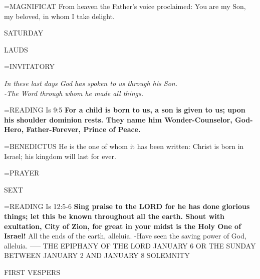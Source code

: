 \hangindent=\parindent \small{MAGNIFICAT 	From heaven the Father's voice proclaimed: You are my Son, my beloved, in whom I take delight.\\}

\begin{center}
\normalsize SATURDAY
\end{center}
\begin{flushleft}\normalsize LAUDS\\\end{flushleft}
\hangindent=\parindent \small{INVITATORY}
\begin{center}
\textit{In these last days God has spoken to us through his Son.\\}
\textit{-The Word through whom he made all things.\\}
\end{center}

\hangindent=\parindent \small{READING}    Is 9:5 \textbf{   For a child is born to us, a son is given to us; upon his shoulder dominion rests. They name him Wonder-Counselor, God-Hero, Father-Forever, Prince of Peace.\\}

\hangindent=\parindent \small{BENEDICTUS 	He is the one of whom it has been written: Christ is born in Israel; his kingdom will last for ever.\\}

\hangindent=\parindent \small{PRAYER 	}

\begin{flushleft}\normalsize SEXT\\\end{flushleft}
\hangindent=\parindent \small{READING}    Is 12:5-6 \textbf{   Sing praise to the LORD for he has done glorious things; let this be known throughout all the earth. Shout with exultation, City of Zion, for great in your midst is the Holy One of Israel!}
All the ends of the earth, alleluia.
-Have seen the saving power of God, alleluia.
-----
THE EPIPHANY OF THE LORD
JANUARY 6 OR THE SUNDAY BETWEEN JANUARY 2 AND JANUARY 8
SOLEMNITY

\begin{flushleft}\normalsize FIRST VESPERS\\\end{flushleft}

